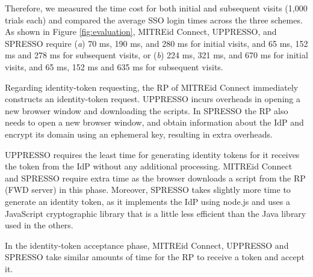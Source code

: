 Therefore, we measured the time cost for both initial and subsequent visits (1,000 trials each) and compared the average SSO login times across the three schemes. As shown in Figure \ref{fig:evaluation},
MITREid Connect, UPPRESSO, and SPRESSO require (\emph{a}) 70 ms, 190 ms, and 280 ms for initial visits, and 65 ms, 152 ms and 278 ms for subsequent visits,
 or (\emph{b}) 224 ms, 321 ms, and 670 ms for initial visits, and 65 ms, 152 ms and 635 ms for subsequent visits.

Regarding identity-token requesting, %
the RP of MITREid Connect immediately constructs an identity-token request. %
UPPRESSO incurs overheads in opening a new browser window and downloading the scripts.
%
%
In SPRESSO the RP also needs to open a new browser window, and obtain information about the IdP %
and encrypt its domain using an ephemeral key, resulting in extra overheads.

UPPRESSO requires the least time for generating identity tokens for it receives the token from the IdP without any additional processing.
MITREid Connect and SPRESSO require extra time as the browser downloads a script from the RP (FWD server) in this phase. %
Moreover, SPRESSO takes slightly more time to generate an identity token, as it implements the IdP using node.js and uses a JavaScript cryptographic library that is a little less efficient than the Java library used in the others.

In the identity-token acceptance phase, 
MITREid Connect,  UPPRESSO and SPRESSO take similar amounts of time for the RP to receive a token and accept it.

